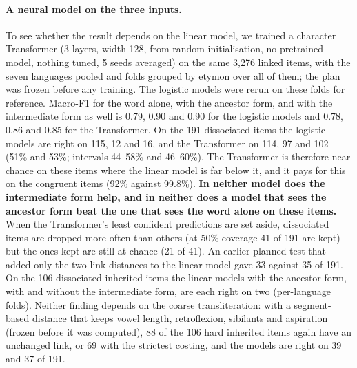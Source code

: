 \documentclass[11pt]{article}
\begin{document}
\paragraph{A neural model on the three inputs.} To see whether the result depends on the linear model, we trained a character Transformer (3 layers, width 128, from random initialisation, no pretrained model, nothing tuned, 5 seeds averaged) on the same 3,276 linked items, with the seven languages pooled and folds grouped by etymon over all of them; the plan was frozen before any training. The logistic models were rerun on these folds for reference. Macro-F1 for the word alone, with the ancestor form, and with the intermediate form as well is 0.79, 0.90 and 0.90 for the logistic models and 0.78, 0.86 and 0.85 for the Transformer. On the 191 dissociated items the logistic models are right on 115, 12 and 16, and the Transformer on 114, 97 and 102 (51\% and 53\%; intervals 44--58\% and 46--60\%). The Transformer is therefore near chance on these items where the linear model is far below it, and it pays for this on the congruent items (92\% against 99.8\%). \textbf{In neither model does the intermediate form help, and in neither does a model that sees the ancestor form beat the one that sees the word alone on these items.} When the Transformer's least confident predictions are set aside, dissociated items are dropped more often than others (at 50\% coverage 41 of 191 are kept) but the ones kept are still at chance (21 of 41). An earlier planned test that added only the two link distances to the linear model gave 33 against 35 of 191. On the 106 dissociated inherited items the linear models with the ancestor form, with and without the intermediate form, are each right on two (per-language folds). Neither finding depends on the coarse transliteration: with a segment-based distance that keeps vowel length, retroflexion, sibilants and aspiration (frozen before it was computed), 88 of the 106 hard inherited items again have an unchanged link, or 69 with the strictest costing, and the models are right on 39 and 37 of 191.
\end{document}
